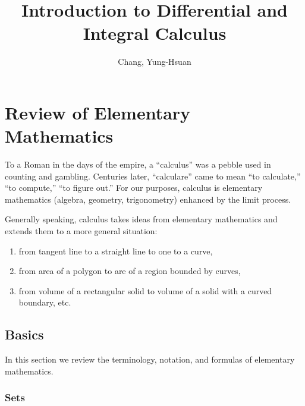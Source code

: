 \documentclass[11pt]{book}
\title{\textbf{Introduction to Differential and Integral Calculus}}
\author{Chang, Yung-Hsuan}
\theoremstyle{break}
\theoremstyle{no_label}
\numberwithin{equation}{section}
\begin{document}
\maketitle
\thispagestyle{empty}
\newpage
{}
\newpage
{}
{}
\tableofcontents



\newpage
{}

\chapter{Review of Elementary Mathematics}

To a Roman in the days of the empire, a “calculus” was a pebble used in counting and gambling. Centuries later, “calculare” came to mean “to calculate,” “to compute,” “to figure out.” For our purposes, calculus is elementary mathematics (algebra, geometry, trigonometry) enhanced by the limit process.

Generally speaking, calculus takes ideas from elementary mathematics and extends them to a more general situation: 
\begin{enumerate}
    \item from tangent line to a straight line to one to a curve,
    \item from area of a polygon to are of a region bounded by curves,
    \item from volume of a rectangular solid to volume of a solid with a curved boundary, etc.
\end{enumerate}

\section{Basics}

In this section we review the terminology, notation, and formulas of elementary mathematics.

\subsection*{Sets}
\end{document}
